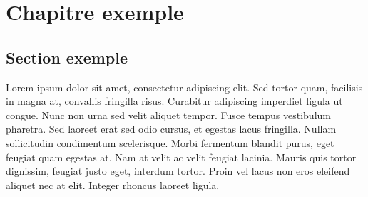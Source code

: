 \chapter{Chapitre exemple}

\section{Section exemple}
Lorem ipsum dolor sit amet, consectetur adipiscing elit. Sed tortor quam, facilisis in magna at, convallis fringilla risus. Curabitur adipiscing imperdiet ligula ut congue. Nunc non urna sed velit aliquet tempor. Fusce tempus vestibulum pharetra. Sed laoreet erat sed odio cursus, et egestas lacus fringilla. Nullam sollicitudin condimentum scelerisque. Morbi fermentum blandit purus, eget feugiat quam egestas at. Nam at velit ac velit feugiat lacinia. Mauris quis tortor dignissim, feugiat justo eget, interdum tortor. Proin vel lacus non eros eleifend aliquet nec at elit. Integer rhoncus laoreet ligula.


